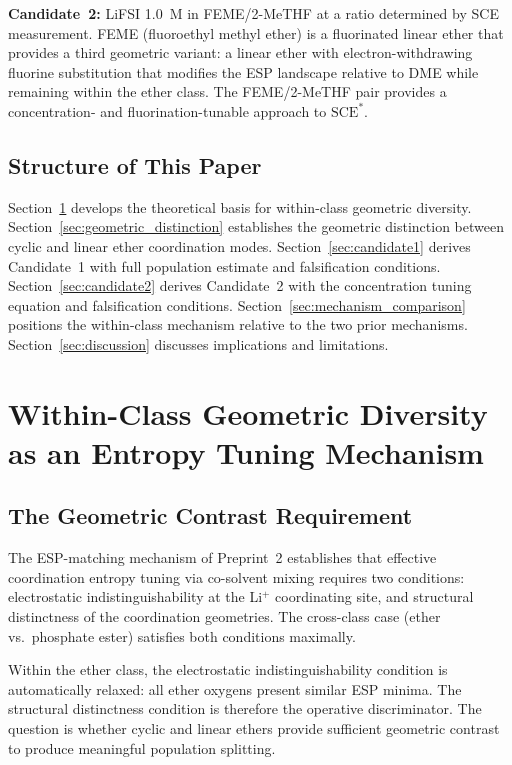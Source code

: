 \documentclass[11pt]{article}
\theoremstyle{plain}
\theoremstyle{definition}
\theoremstyle{remark}
\begin{document}
\textbf{Candidate~2:} LiFSI 1.0~M in FEME/2-MeTHF at a ratio
determined by SCE measurement.  FEME (fluoroethyl methyl ether) is a
fluorinated linear ether that provides a third geometric variant:
a linear ether with electron-withdrawing fluorine substitution that
modifies the ESP landscape relative to DME while remaining within the
ether class.  The FEME/2-MeTHF pair provides a concentration- and
fluorination-tunable approach to $\mathrm{SCE}^{*}$.

\subsection{Structure of This Paper}

Section~\ref{sec:within_class_theory} develops the theoretical basis
for within-class geometric diversity.
Section~\ref{sec:geometric_distinction} establishes the geometric
distinction between cyclic and linear ether coordination modes.
Section~\ref{sec:candidate1} derives Candidate~1 with full population
estimate and falsification conditions.
Section~\ref{sec:candidate2} derives Candidate~2 with the
concentration tuning equation and falsification conditions.
Section~\ref{sec:mechanism_comparison} positions the within-class
mechanism relative to the two prior mechanisms.
Section~\ref{sec:discussion} discusses implications and limitations.

\section{Within-Class Geometric Diversity as an Entropy Tuning Mechanism}
\label{sec:within_class_theory}

\subsection{The Geometric Contrast Requirement}

The ESP-matching mechanism of Preprint~2 establishes that effective
coordination entropy tuning via co-solvent mixing requires two
conditions: electrostatic indistinguishability at the Li$^+$
coordinating site, and structural distinctness of the coordination
geometries.  The cross-class case (ether vs.\ phosphate ester) satisfies
both conditions maximally.

Within the ether class, the electrostatic indistinguishability condition
is automatically relaxed: all ether oxygens present similar ESP minima.
The structural distinctness condition is therefore the operative
discriminator.  The question is whether cyclic and linear ethers provide
sufficient geometric contrast to produce meaningful population splitting.
\end{document}
